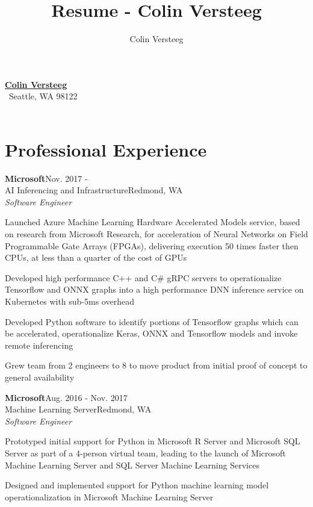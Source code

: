 \documentclass[letterpaper,11pt]{article}
\title{Resume - Colin Versteeg}
\author{Colin Versteeg}
\def \jobskip{1em}
\newcommand{\resentry}[6]{
\large{\sffamily\textbf{#1}}\hfill{\rmfamily\normalsize\textcolor{faded}{#2}} \\
\normalsize{#3}\hfill{\textcolor{faded}{\normalsize#4}}\\
\normalsize{#5}
\footnotesize{#6}
}
\begin{document}
\begin{center}
    \href{http://www.linkedin.com/pub/colin-versteeg/5b/26b/1b8}{{\huge\bf\sffamily Colin Versteeg}} \\
\ifdefined\PRINTADDRESS   
{\rmfamily {}} \textbullet \, Seattle, WA 98122 \\ 
\fi
\ifdefined\PRINTPHONE
{\rmfamily {}} \textbullet \,
\fi
 {\rmfamily {}}
\end{center}
\section*{Professional Experience}
\resentry{{Microsoft}}{Nov. 2017 \--}{AI Inferencing and Infrastructure}{Redmond, WA}{\emph{Software Engineer}}
{ 
      \begin{resumeitemize}
	 \item{Launched Azure Machine Learning Hardware Accelerated Models service, based on research from Microsoft Research, for acceleration of Neural Networks on Field Programmable Gate Arrays (FPGAs), delivering execution 50 times faster then CPUs, at less than a quarter of the cost of GPUs}	
	\item{Developed high performance C++ and C\# gRPC servers to operationalize Tensorflow and ONNX graphs into a high performance DNN inference service on Kubernetes with sub-5ms overhead}
	\item{Developed Python software to identify portions of Tensorflow graphs which can be accelerated, operationalize Keras, ONNX and Tensorflow models and invoke remote inferencing}
          \item{Grew team from 2 engineers to 8 to move product from initial proof of concept to general availability}
          \end{resumeitemize}
}
\vspace{\jobskip}
\resentry{{Microsoft}}{Aug. 2016 \-- Nov. 2017}{Machine Learning Server}{Redmond, WA}{\emph{Software Engineer}}
{ 
      \begin{resumeitemize}
	\item {Prototyped initial support for Python in Microsoft R Server and Microsoft SQL Server as part of a 4-person virtual team, leading to the launch of Microsoft Machine Learning Server and SQL Server Machine Learning Services}
	 \item{Designed and implemented support for Python machine learning model operationalization in Microsoft Machine Learning Server}	
          \end{resumeitemize}
}
\end{document}
